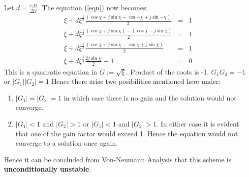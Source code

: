 \documentclass[a4paper,12pt]{report}
\begin{document}
Let $d=\frac{c\Delta t}{\Delta x}$. The equation (\ref{eqn}) now becomes:
\begin{eqnarray}
\xi + d \xi^{\frac{1}{2}}\frac{(\cos{\chi}+j\sin{\chi} - \cos{-\chi}+j\sin{-\chi})}{2} &=& 1 \nonumber \\
\xi + d \xi^{\frac{1}{2}}\frac{(\cos{\chi}+j\sin{\chi}) - (\cos{\chi}-j\sin{\chi})}{2} &=& 1 \nonumber \\
\xi + d \xi^{\frac{1}{2}}\frac{(\cos{\chi}+j\sin{\chi} - \cos{\chi}+j\sin{\chi})}{2}&=&1\nonumber \\
\xi + d \xi^{\frac{1}{2}}\frac{2j\sin{\chi}}{2}-1&=&0
\end{eqnarray}
This is a quadratic equation in $G := \sqrt{\xi}$. Product of the roots is -1. \newline
$G_1G_2 = -1$ or $|G_1||G_2| = 1$
Hence there arise two posibilities mentioned here under:
\begin{enumerate}
\item $|G_1|=|G_2|=1$ in which case there is no gain and the solution would not converge.
\item $|G_1|<1$ and $|G_2|> 1$ or $|G_1|<1$ and $|G_2|> 1$. In either case it is evident that one of the gain factor would exceed 1. Hence the equation would not converge to a solution once again.
\end{enumerate}
Hence it can be concluded from Von-Neumann Analysis that this scheme is \textbf{unconditionally unstable}. 
\end{document}
